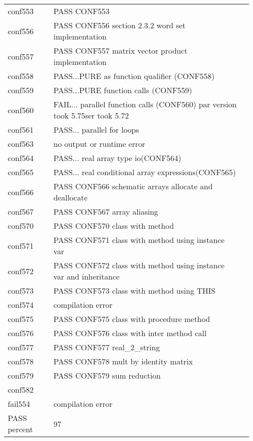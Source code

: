 \begin{tabular}{llc}
  conf553&PASS CONF553&\\
  conf556&PASS CONF556 section 2.3.2  word set implementation&\\
  conf557&PASS CONF557 matrix vector product implementation&\\
  conf558& PASS...PURE as function qualifier (CONF558)&\\
  conf559& PASS...PURE function calls (CONF559)&\\
  conf560& FAIL...  parallel function calls (CONF560) par version took        5.75ser took        5.72&\\
  conf561& PASS...  parallel for loops&\\
  conf563& no output or runtime error &\\
  conf564& PASS...  real array type io(CONF564)&\\
  conf565& PASS...  real conditional array expressions(CONF565)&\\
  conf566&PASS CONF566 schematic arrays allocate and deallocate&\\
  conf567&PASS CONF567 array aliasing&\\
  conf570&PASS CONF570 class with method&\\
  conf571&PASS CONF571 class with method using instance var&\\
  conf572&PASS CONF572 class with method using instance var and inheritance&\\
  conf573&PASS CONF573 class with method using THIS&\\
  conf574& compilation error &\\
  conf575&PASS CONF575 class with procedure method&\\
  conf576&PASS CONF576 class with inter method call&\\
  conf577&PASS CONF577 real\_2\_string&\\
  conf578&PASS CONF578 mult by identity matrix&\\
  conf579&PASS CONF579 sum reduction&\\
  conf582&&\\
  fail554& compilation error &\\
  PASS percent& 97&\\
\end{tabular}
